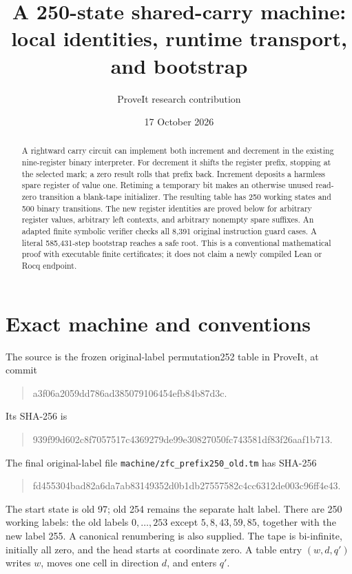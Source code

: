 \documentclass[11pt]{article}
\title{A 250-state shared-carry machine:\\local identities, runtime transport, and bootstrap}
\author{ProveIt research contribution}
\date{17 October 2026}
\begin{document}
\maketitle

\begin{abstract}
A rightward carry circuit can implement both increment and decrement in the
existing nine-register binary interpreter.  For decrement it shifts the
register prefix, stopping at the selected mark; a zero result rolls that
prefix back.  Increment deposits a harmless spare register of value one.
Retiming a temporary bit makes an otherwise unused read-zero transition a
blank-tape initializer.  The resulting table has 250 working states and 500
binary transitions.  The new register identities are proved below for
arbitrary register values, arbitrary left contexts, and arbitrary nonempty
spare suffixes.  An adapted finite symbolic verifier checks all 8,391 original
instruction guard cases.  A literal 585,431-step bootstrap reaches a safe root.
This is a conventional mathematical proof with executable finite
certificates; it does not claim a newly compiled Lean or Rocq endpoint.
\end{abstract}

\section{Exact machine and conventions}

The source is the frozen original-label permutation252 table in ProveIt,
at commit
\begin{quote}\small\ttfamily
a3f06a2059dd786ad385079106454efb84b87d3c.
\end{quote}
Its SHA-256 is
\begin{quote}\small\ttfamily
939f99d602c8f7057517c4369279de99e30827050fc743581df83f26aaf1b713.
\end{quote}
The final original-label file \texttt{machine/zfc\_prefix250\_old.tm} has SHA-256
\begin{quote}\small\ttfamily
fd455304bad82a6da7ab83149352d0b1db27557582c4cc6312de003c96ff4e43.
\end{quote}
The start state is old 97; old 254 remains the separate halt label.  There
are 250 working labels: the old labels $0,\ldots,253$ except
$5,8,43,59,85$, together with the new label 255.  A canonical renumbering is
also supplied.  The tape is bi-infinite, initially all zero, and the head
starts at coordinate zero.  A table entry $(w,d,q')$ writes $w$, moves one
cell in direction $d$, and enters $q'$.
\end{document}
